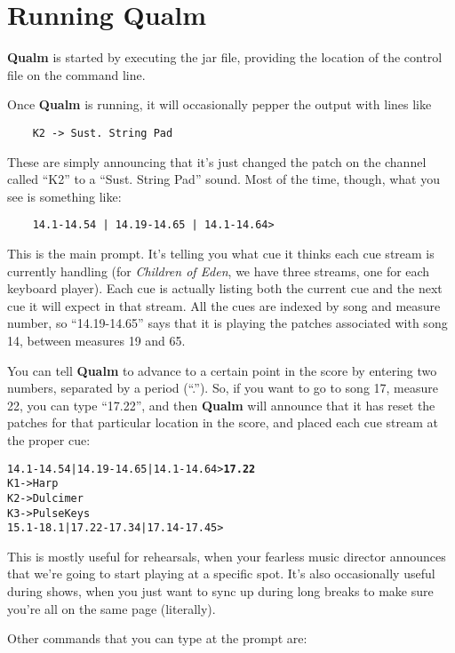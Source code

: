 \documentclass{article}
\newcommand{\q}{{\textsf{\textbf{Qualm}}}\xspace}
\begin{document}
\section{Running \q}

\q is started by executing the jar file, providing the location of the
control file on the command line.

Once \q is running, it will occasionally pepper the output with lines
like

\begin{verbatim}
    K2 -> Sust. String Pad
\end{verbatim}

These are simply announcing that it's just changed the patch on the
channel called ``K2'' to a ``Sust. String Pad'' sound.  Most of the time,
though, what you see is something like:

\begin{verbatim}
    14.1-14.54 | 14.19-14.65 | 14.1-14.64>
\end{verbatim}

This is the main prompt.  It's telling you what cue it thinks each cue
stream is currently handling (for {\em Children of Eden}, we have three
streams, one for each keyboard player).  Each cue is actually listing
both the current cue and the next cue it will expect in that stream. 
All the cues are indexed by song and measure number, so ``14.19-14.65''
says that it is playing the patches associated with song 14, between
measures 19 and 65.

You can tell \q to advance to a certain point in the score by
entering two numbers, separated by a period (``.'').  So, if you want to
go to song 17, measure 22, you can type ``17.22'', and then \q will
announce that it has reset the patches for that particular location in
the score, and placed each cue stream at the proper cue:


\begin{alltt}
    14.1-14.54 | 14.19-14.65 | 14.1-14.64> \textbf{17.22}
    K1 -> Harp
    K2 -> Dulcimer
    K3 -> Pulse Keys
    15.1-18.1 | 17.22-17.34 | 17.14-17.45>
\end{alltt}

This is mostly useful for rehearsals, when your fearless music
director announces that we're going to start playing at a specific
spot.  It's also occasionally useful during shows, when you just want
to sync up during long breaks to make sure you're all on the same page
(literally).

Other commands that you can type at the prompt are:
\end{document}
